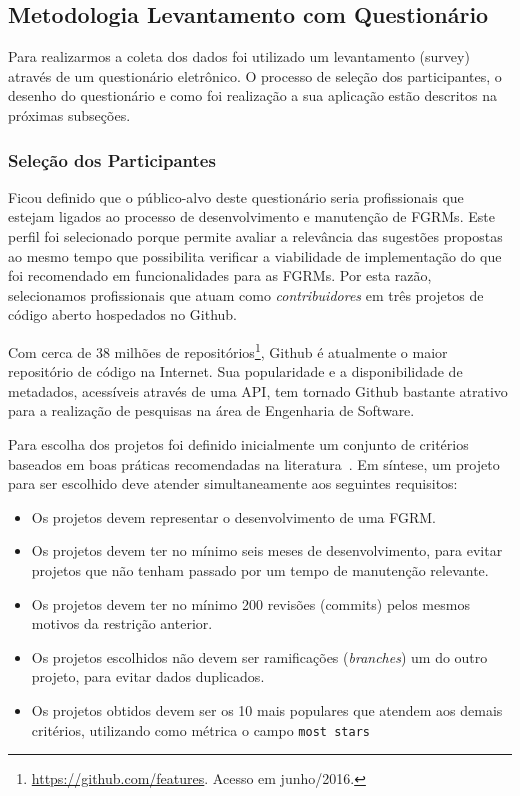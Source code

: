 \subsection{Metodologia Levantamento com Questionário}
\label{sub:sug_melhoria_metodologia_levantamento}

Para realizarmos a coleta dos dados foi utilizado um levantamento (survey)
através de um questionário eletrônico. O processo de seleção dos participantes,
o desenho do questionário e como foi realização a sua aplicação estão descritos
na próximas subseções.

\subsubsection{Seleção dos Participantes}
\label{ssub:sug_melhoria_selecao_participantes}

Ficou definido que o público-alvo deste questionário seria profissionais que
estejam ligados ao processo de desenvolvimento e manutenção de FGRMs. Este
perfil foi selecionado porque permite avaliar a relevância das sugestões
propostas ao mesmo tempo que possibilita verificar a viabilidade de
implementação do que foi recomendado em funcionalidades para as FGRMs. Por esta
razão, selecionamos profissionais que atuam como \textit{contribuidores} em três
projetos de código aberto hospedados no Github.

Com cerca de 38 milhões de
repositórios\footnote{\url{https://github.com/features}. Acesso em junho/2016.},
Github é atualmente o maior repositório de código na Internet. Sua popularidade
e a disponibilidade de metadados, acessíveis através de uma API, tem tornado
Github bastante atrativo para a realização de pesquisas na área de Engenharia de
Software.

Para escolha dos projetos foi definido inicialmente um conjunto de critérios
baseados em boas práticas recomendadas na literatura~\cite{Bird2009}. Em
síntese, um projeto para ser escolhido deve atender simultaneamente
aos seguintes requisitos:

\begin{itemize}
	\item Os projetos devem representar o desenvolvimento de uma FGRM\@.
	\item Os projetos devem ter no mínimo seis meses de desenvolvimento, para
		evitar projetos que não tenham passado por um tempo de manutenção
		relevante.
	\item Os projetos devem  ter  no  mínimo  200  revisões (commits)  pelos
		mesmos motivos  da restrição anterior.
	\item Os projetos escolhidos não devem ser ramificações (\textsl{branches}) um
		do outro projeto, para evitar dados duplicados.
	\item Os projetos obtidos devem ser os 10 mais populares que atendem aos
		demais critérios, utilizando como métrica o campo \texttt{most stars}
\end{itemize}

